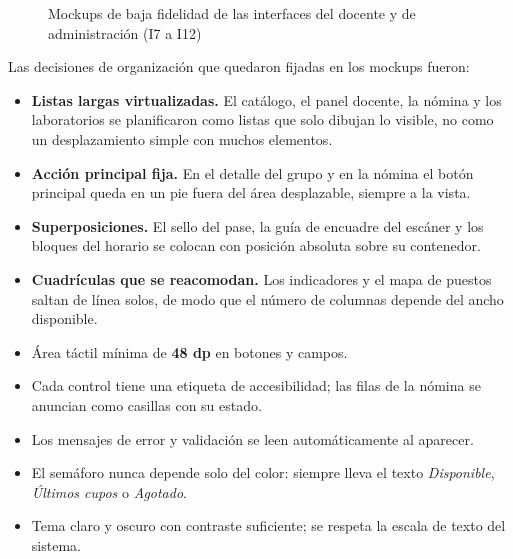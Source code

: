 \begin{figure}[!htbp]
\centering
{}
\caption{Mockups de baja fidelidad de las interfaces del docente y de administración (I7 a I12)}
\label{fig:mockups_d}
\end{figure}

Las decisiones de organización que quedaron fijadas en los mockups fueron:

\begin{itemize}[label=\textcolor{unsared}{\textbullet}, leftmargin=*]
    \item \textbf{Listas largas virtualizadas.} El catálogo, el panel docente, la nómina y los laboratorios se planificaron como listas que solo dibujan lo visible, no como un desplazamiento simple con muchos elementos.
    \item \textbf{Acción principal fija.} En el detalle del grupo y en la nómina el botón principal queda en un pie fuera del área desplazable, siempre a la vista.
    \item \textbf{Superposiciones.} El sello del pase, la guía de encuadre del escáner y los bloques del horario se colocan con posición absoluta sobre su contenedor.
    \item \textbf{Cuadrículas que se reacomodan.} Los indicadores y el mapa de puestos saltan de línea solos, de modo que el número de columnas depende del ancho disponible.
\end{itemize}

\vspace{0.2cm}

\begin{itemize}[label=\textcolor{unsared}{\textbullet}, leftmargin=*]
    \item Área táctil mínima de \textbf{48 dp} en botones y campos.
    \item Cada control tiene una etiqueta de accesibilidad; las filas de la nómina se anuncian como casillas con su estado.
    \item Los mensajes de error y validación se leen automáticamente al aparecer.
    \item El semáforo nunca depende solo del color: siempre lleva el texto \textit{Disponible}, \textit{Últimos cupos} o \textit{Agotado}.
    \item Tema claro y oscuro con contraste suficiente; se respeta la escala de texto del sistema.
\end{itemize}

